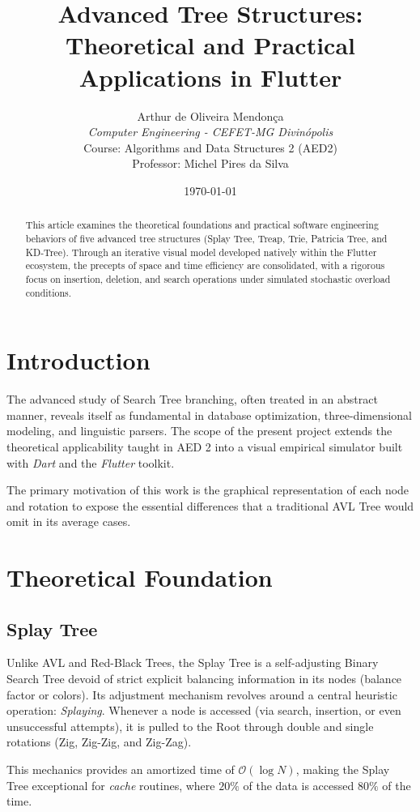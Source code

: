 \documentclass[12pt,a4paper]{article}
\title{\textbf{Advanced Tree Structures: Theoretical and Practical Applications in Flutter}}
\author{
    Arthur de Oliveira Mendonça \\
    \textit{Computer Engineering - CEFET-MG Divinópolis} \\
    Course: Algorithms and Data Structures 2 (AED2) \\
    Professor: Michel Pires da Silva
}
\date{\today}
\begin{document}
\maketitle

\begin{abstract}
This article examines the theoretical foundations and practical software engineering behaviors of five advanced tree structures (Splay Tree, Treap, Trie, Patricia Tree, and KD-Tree). Through an iterative visual model developed natively within the Flutter ecosystem, the precepts of space and time efficiency are consolidated, with a rigorous focus on insertion, deletion, and search operations under simulated stochastic overload conditions.
\end{abstract}

\section{Introduction}
The advanced study of Search Tree branching, often treated in an abstract manner, reveals itself as fundamental in database optimization, three-dimensional modeling, and linguistic parsers. The scope of the present project extends the theoretical applicability taught in AED 2 into a visual empirical simulator built with \textit{Dart} and the \textit{Flutter} toolkit. 

The primary motivation of this work is the graphical representation of each node and rotation to expose the essential differences that a traditional AVL Tree would omit in its average cases.

\section{Theoretical Foundation}

\subsection{Splay Tree}
Unlike AVL and Red-Black Trees, the Splay Tree is a self-adjusting Binary Search Tree devoid of strict explicit balancing information in its nodes (balance factor or colors). Its adjustment mechanism revolves around a central heuristic operation: \textit{Splaying}. Whenever a node is accessed (via search, insertion, or even unsuccessful attempts), it is pulled to the Root through double and single rotations (Zig, Zig-Zig, and Zig-Zag).

This mechanics provides an amortized time of $\mathcal{O}(\log N)$, making the Splay Tree exceptional for \textit{cache} routines, where $20\%$ of the data is accessed $80\%$ of the time.
\end{document}
